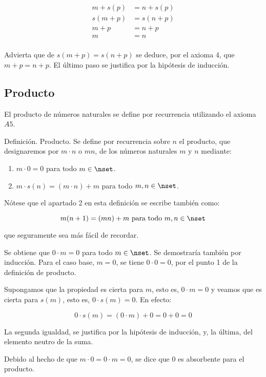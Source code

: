 \begin{align*}
  m + s(p)  &= n + s(p) \\
  s(m + p)  &= s(n + p) \\
  m + p     &= n + p \\
  m         &= n \\
\end{align*}

\noindent Advierta que de $s(m + p) = s(n + p)$ se deduce, por el axioma 4,
que $m + p = n + p$. El último paso se justifica por la hipótesis de
inducción.






\subsection{Producto}

El producto de números naturales se define por recurrencia utilizando el
axioma $A5$.

Definición. Producto. Se define por recurrencia sobre $n$ el producto, que
designaremos por $m \cdot n$ o $mn$, de los números naturales $m$ y $n$
mediante:

\begin{enumerate}
  \item $m \cdot 0 = 0$ para todo $m \in \nset$.
  \item $m \cdot s(n) = (m \cdot n) + m$ para todo $m, n \in \nset$.
\end{enumerate}

Nótese que el apartado 2 en esta definición se escribe también como:

$$ m(n + 1) = (mn) + m \ \text{para todo} \ m, n \in \nset $$

\noindent que seguramente sea más fácil de recordar.

Se obtiene que $0 \cdot m = 0$ para todo $m \in \nset$. Se demostraría
también por inducción. Para el caso base, $m = 0$, se tiene $0 \cdot 0 = 0$,
por el punto 1 de la definición de producto.

Supongamos que la propiedad es cierta para $m$, esto es, $0 \cdot m = 0$ y
veamos que es cierta para $s(m)$, esto es, $0 \cdot s(m) = 0$. En efecto:

$$ 0 \cdot s(m) = (0 \cdot m) + 0 = 0 + 0 = 0 $$

\noindent La segunda igualdad, se justifica por la hipótesis de inducción,
y, la última, del elemento neutro de la suma.

Debido al hecho de que $m \cdot 0 = 0 \cdot m = 0$, se dice que 0 es
absorbente para el producto.

